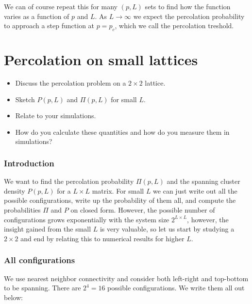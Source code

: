 \documentclass[a4paper, 11pt, notitlepage, english]{article}
\begin{document}
We can of course repeat this for many $(p, L)$ sets to find how the function varies as a function of $p$ and $L$. As $L\to\infty$ we expect the percolation probability to approach a step function at $p=p_c$, which we call the percolation treshold. 

\clearpage


\section{Percolation on small lattices}
\begin{itemize}
	\item Discuss the percolation problem on a $2\times 2$ lattice.
	\item Sketch $P(p, L)$ and $\Pi(p, L)$ for small $L$.
	\item Relate to your simulations.
	\item How do you calculate these quantities and how do you measure them in simulations?
\end{itemize}
  
\subsubsection*{Introduction}

We want to find the percolation probability $\Pi(p, L)$ and the spanning cluster density $P(p, L)$ for a $L\times L$ matrix. For small $L$ we can just write out all the possible configurations, write up the probability of them all, and compute the probabilities $\Pi$ and $P$ on closed form. However, the possible number of configurations grows exponentially with the system size $2^{L\times L}$, however, the insight gained from the small $L$ is very valuable, so let us start by studying a $2\times 2$ and end by relating this to numerical results for higher $L$.


\subsubsection*{All configurations}
We use nearest neighbor connectivity and consider both left-right and top-bottom to be spanning. There are $2^4 = 16$ possible configurations. We write them all out below:
\end{document}
